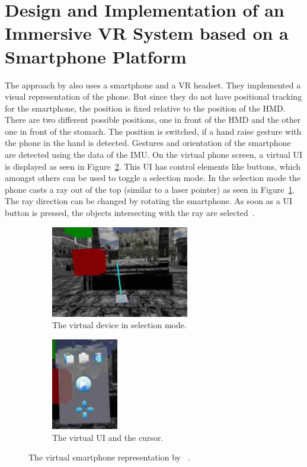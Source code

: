 \section{Design and Implementation of an Immersive VR System based on a Smartphone Platform}\label{section:design-implementation-vr-system-smartphone-platform}
The approach by \citeauthor{Steed.2013} also uses a smartphone and a \ac{VR} headset. They implemented a visual representation of the phone. But since they do not have positional tracking for the smartphone, the position is fixed relative to the position of the \ac{HMD}. There are two different possible positions, one in front of the \ac{HMD} and the other one in front of the stomach. The position is switched, if a hand raise gesture with the phone in the hand is detected. Gestures and orientation of the smartphone are detected using the data of the \ac{IMU}. On the virtual phone screen, a virtual \ac{UI} is displayed as seen in Figure~\ref{fig:steed-2013-ui}. This \ac{UI} has control elements like buttons, which amongst others can be used to toggle a selection mode. In the selection mode the phone casts a ray out of the top (similar to a laser pointer) as seen in Figure~\ref{fig:steed-2013-laser-pointer}. The ray direction can be changed by rotating the smartphone. As soon as a \ac{UI} button is pressed, the objects intersecting with the ray are selected~\cite{Steed.2013}.

\begin{figure}[H]
  \centering
  \begin{subfigure}{0.45\textwidth}%
    \centering%
    \includegraphics[height=4cm]{figures/steed_2013_laser_pointer.png}
    \caption{The virtual device in selection mode.}\label{fig:steed-2013-laser-pointer}%
  \end{subfigure}%
  \hspace{0.1\textwidth}%
  \begin{subfigure}{0.45\textwidth}%
    \centering%
    \includegraphics[height=4cm]{figures/steed_2013_ui.png}
    \caption{The virtual \ac{UI} and the cursor.}\label{fig:steed-2013-ui}
  \end{subfigure}%
  \caption[Virtual smartphone representation by Steep et al.]{The virtual smartphone representation by \citeauthor{Steed.2013}~\protect\cite[43]{Steed.2013}.}\label{fig:dias-2018}
\end{figure}